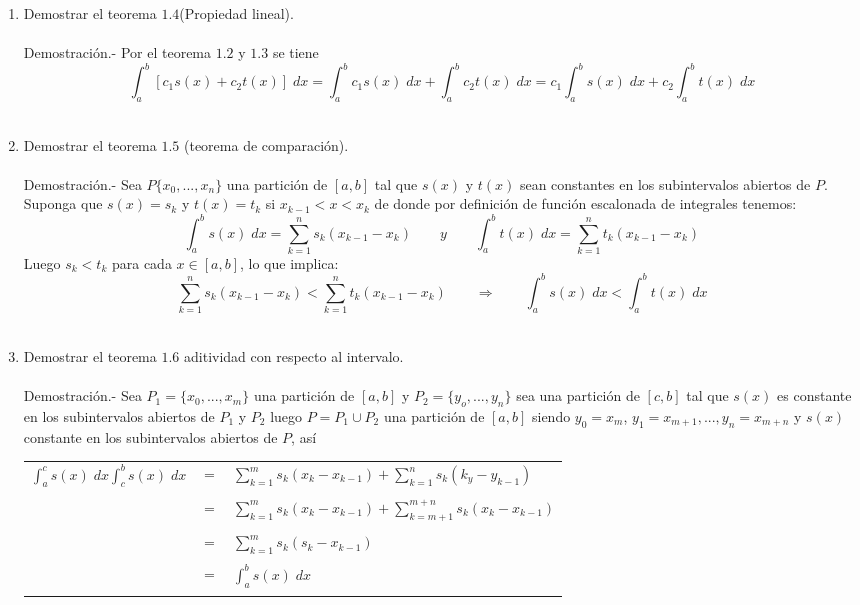 \begin{enumerate}[ \bfseries 1.]
    \item Demostrar el teorema $1.4$(Propiedad lineal).\\\\
	Demostración.-\; Por el teorema $1.2$ y $1.3$ se tiene $$\displaystyle\int_a^b \left[c_1 s(x) + c_2 t(x)\right] \; dx = \int_a^b c_1 s(x) \; dx + \int_a^b c_2 t(x) \; dx = c_1 \int_a^b s(x) \;dx  + c_2 \int_a^b t(x) \; dx$$\\ 

    \item Demostrar el teorema $1.5$ (teorema de comparación).\\\\
	Demostración.-\; Sea $P\lbrace x_0,...,x_n \rbrace$ una partición de $[a,b]$ tal que $s(x)$ y $t(x)$ sean constantes en los subintervalos abiertos de $P$. Suponga que $s(x)=s_k$ y $t(x)=t_k$ si $x_{k-1}<x<x_k$ de donde por definición de función escalonada de integrales tenemos:
	$$\displaystyle\int_a^b s(x) \; dx = \sum\limits_{k=1}^n s_k(x_{k-1} - x_k) \qquad y \qquad \int_a^b t(x) \;dx = \sum\limits_{k=1}^n t_k(x_{k-1} - x_k)$$
	Luego $s_k<t_k$ para cada $x\in [a,b]$, lo que implica:
	$$\displaystyle  \sum\limits_{k=1}^n s_k(x_{k-1} - x_k)  < \sum\limits_{k=1}^n t_k(x_{k-1} - x_k) \qquad \Rightarrow \qquad \int_a^b s(x) \; dx < \int_a^b t(x) \;dx$$\\

    \item Demostrar el teorema $1.6$ aditividad con respecto al intervalo.\\\\
	Demostración.-\; Sea $P_1=\lbrace x_0,...,x_m\rbrace$ una partición de $[a,b]$ y $P_2=\lbrace y_o,...,y_n \rbrace$ sea una partición de $[c,b]$ tal que $s(x)$ es constante en los subintervalos abiertos de $P_1$ y $P_2$ luego $P=P_1 \cup P_2$ una partición de $[a,b]$ siendo $y_0=x_m$, $y_1=x_{m+1},...,y_n=x_{m+n}$ y $s(x)$ constante en los subintervalos abiertos de $P$, así
	\begin{center}
	    \begin{tabular}{rcl}
		$\displaystyle\int_{a}^{c} s(x) \; dx \int_c^b s(x) \;dx$&$=$&$\sum\limits_{k=1}^{m} s_k (x_k-x_{k-1}) + \sum\limits_{k=1}^n s_k(k_y - y_{k-1})$\\\\
		&$=$&$\sum\limits_{k=1}^m s_k(x_k - x_{k-1}) + \sum\limits_{k=m+1}^{m+n} s_k(x_k - x_{k-1})$\\\\
		&$=$&$\sum\limits_{k=1}^m s_k(s_k - x_{k-1})$\\\\
		&$=$&$\displaystyle\int_{a}^b s(x) \; dx$\\\\
	    \end{tabular}
	\end{center}


\end{enumerate}
